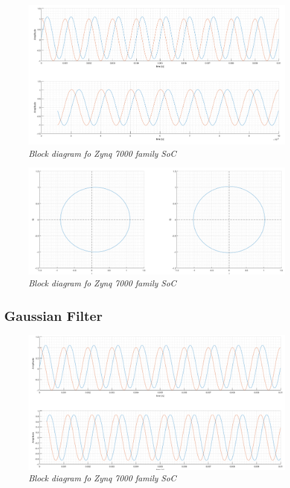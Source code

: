 \documentclass[en,printmode]{mgr}
\begin{document}
			\begin{figure}[!htb]
    			\centering
   				\includegraphics[width=\textwidth]{plots/mov_av_t.png}
   			 	\caption{\textit{Block diagram fo Zynq 7000 family SoC}}
			\end{figure}
		
			\begin{figure}[!htb]
    			\centering
   				\includegraphics[width=\textwidth]{plots/mov_av_c.png}
   			 	\caption{\textit{Block diagram fo Zynq 7000 family SoC}}
			\end{figure}
		
		\subsection*{Gaussian Filter}
			\begin{figure}[!htb]
    			\centering
   				\includegraphics[width=\textwidth]{plots/gauss_t.png}
   			 	\caption{\textit{Block diagram fo Zynq 7000 family SoC}}
			\end{figure}
			
\end{document}
